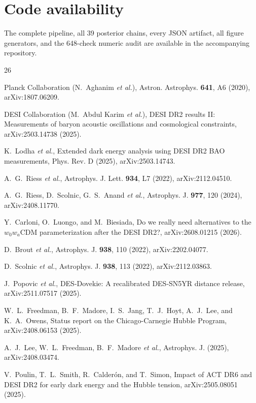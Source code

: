 \documentclass[aps,prd,preprint,superscriptaddress,nofootinbib]{revtex4-2}
\begin{document}
\section*{Code availability}
The complete pipeline, all 39 posterior chains, every JSON artifact, all figure generators, and the 648-check numeric audit are available in the accompanying repository.

\begin{thebibliography}{26}

Planck Collaboration (N.~Aghanim \emph{et al.}), Astron. Astrophys. \textbf{641}, A6 (2020), arXiv:1807.06209.

DESI Collaboration (M.~Abdul Karim \emph{et al.}), DESI DR2 results II: Measurements of baryon acoustic oscillations and cosmological constraints, arXiv:2503.14738 (2025).

K.~Lodha \emph{et al.}, Extended dark energy analysis using DESI DR2 BAO measurements, Phys. Rev. D (2025), arXiv:2503.14743.

A.~G.~Riess \emph{et al.}, Astrophys. J. Lett. \textbf{934}, L7 (2022), arXiv:2112.04510.

A.~G.~Riess, D.~Scolnic, G.~S.~Anand \emph{et al.}, Astrophys. J. \textbf{977}, 120 (2024), arXiv:2408.11770.

Y.~Carloni, O.~Luongo, and M.~Biesiada, Do we really need alternatives to the $w_0 w_a$CDM parameterization after the DESI DR2?, arXiv:2608.01215 (2026).

D.~Brout \emph{et al.}, Astrophys. J. \textbf{938}, 110 (2022), arXiv:2202.04077.

D.~Scolnic \emph{et al.}, Astrophys. J. \textbf{938}, 113 (2022), arXiv:2112.03863.

J.~Popovic \emph{et al.}, DES-Dovekie: A recalibrated DES-SN5YR distance release, arXiv:2511.07517 (2025).

W.~L.~Freedman, B.~F.~Madore, I.~S.~Jang, T.~J.~Hoyt, A.~J.~Lee, and K.~A.~Owens, Status report on the Chicago-Carnegie Hubble Program, arXiv:2408.06153 (2025).

A.~J.~Lee, W.~L.~Freedman, B.~F.~Madore \emph{et al.}, Astrophys. J. (2025), arXiv:2408.03474.

V.~Poulin, T.~L.~Smith, R.~Calder\'on, and T.~Simon, Impact of ACT DR6 and DESI DR2 for early dark energy and the Hubble tension, arXiv:2505.08051 (2025).


\end{thebibliography}
\end{document}
